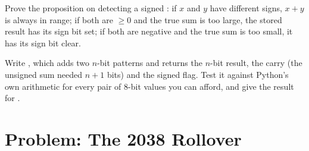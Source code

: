 \begin{exercise}[$\star\star\star$]\label{exo:g10:machine-integers:14}
Prove the proposition on detecting a signed : if $x$ and $y$ have different signs, $x + y$ is always in range;
if both are $\ge 0$ and the true sum is too large, the stored result has its sign bit set; if both are negative and the
true sum is too small, it has its sign bit clear.
\end{exercise}

\begin{exercise}[$\star\star\star$]\label{exo:g10:machine-integers:15}
Write , which adds two $n$-bit patterns and returns the $n$-bit result, the carry (the
unsigned sum needed $n + 1$ bits) and the signed  flag. Test it against Python's own arithmetic for every
pair of $8$-bit values you can afford, and give the result for .
\end{exercise}

\section{Problem: The 2038 Rollover}\label{sec:g10:machine-integers:problem}

